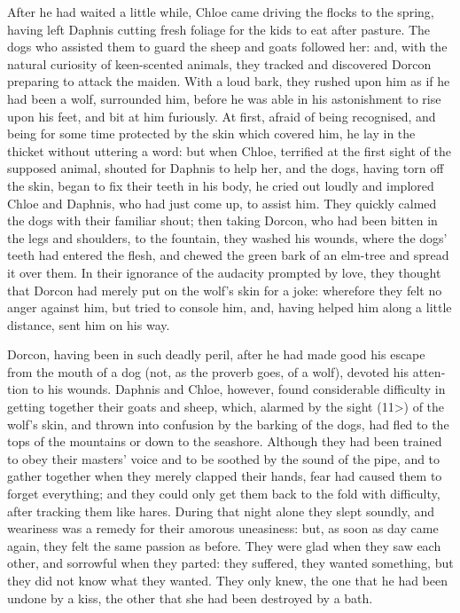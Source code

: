 \documentclass{book}
\begin{document}
\begin{pairs}
\begin{Rightside}
\begin{english}
  After he had waited a little while, Chloe came driving the flocks to the spring, having left Daphnis cutting fresh foliage for the kids to eat after pasture.  The dogs who assisted them to guard the sheep and goats followed her: and, with the natural curiosity of keen-scented animals, they tracked and discovered Dorcon preparing to attack the maiden.  With a loud bark, they rushed upon him as if he had been a wolf, surrounded him, before he was able in his astonishment to rise upon his feet, and bit at him furiously.  At first, afraid of being recognised, and being for some time protected by the skin which covered him, he lay in the thicket without uttering a word: but when Chloe, terrified at the first sight of the supposed animal, shouted for Daphnis to help her, and the dogs, having torn off the skin, began to fix their teeth in his body, he cried out loudly and implored Chloe and Daphnis, who had just come up, to assist him.  They quickly calmed the dogs with their familiar shout; then taking Dorcon, who had been bitten in the legs and shoulders, to the fountain, they washed his wounds, where the dogs' teeth had entered the flesh, and chewed the green bark of an elm-tree and spread it over them.  In their ignorance of the audacity prompted by love, they thought that Dorcon had merely put on the wolf's skin for a joke: wherefore they felt no anger against him, but tried to console him, and, having helped him along a little distance, sent him on his way.
\pend


  Dorcon, having been in such deadly peril, after he had made good his escape from the mouth of a dog (not, as the proverb goes, of a wolf), devoted his attention to his wounds.  Daphnis and Chloe, however, found considerable difficulty in getting together their goats and sheep, which, alarmed by the sight (11>) of the wolf's skin, and thrown into confusion by the barking of the dogs, had fled to the tops of the mountains or down to the seashore.  Although they had been trained to obey their masters' voice and to be soothed by the sound of the pipe, and to gather together when they merely clapped their hands, fear had caused them to forget everything; and they could only get them back to the fold with difficulty, after tracking them like hares.  During that night alone they slept soundly, and weariness was a remedy for their amorous uneasiness: but, as soon as day came again, they felt the same passion as before.  They were glad when they saw each other, and sorrowful when they parted: they suffered, they wanted something, but they did not know what they wanted.  They only knew, the one that he had been undone by a kiss, the other that she had been destroyed by a bath.
\pend



\end{english}
\end{Rightside}
\end{pairs}
\end{document}

